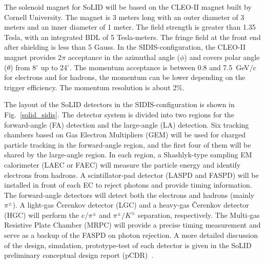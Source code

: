 The solenoid magnet for SoLID will be based on the CLEO-II magnet built by
Cornell University. The magnet is 3 meters long with an outer diameter of 3
meters and an inner diameter of 1 meter. The field strength is greater than
1.35 Tesla, with an integrated BDL of 5 Tesla-meters. The fringe field at the
front end after shielding is less than 5 Gauss. In the SIDIS-configuration, the
CLEO-II magnet provides 2$\pi$ acceptance in the azimuthal angle ($\phi$) and
covers polar angle ($\theta$) from 8$^{\circ}$ up to 24$^{\circ}$. The
momentum acceptance is between 0.8 and 7.5~GeV/c for electrons and for hadrons,
the momentum can be lower depending on the trigger efficiency.  The momentum
resolution is about 2\%.

The layout of the SoLID detectors in the SIDIS-configuration is shown in
Fig.~\ref{solid_sidis}. The detector system is divided into two regions for the
forward-angle (FA) detection and the large-angle (LA) detection. Six tracking
chambers based on Gas Electron Multipliers (GEM) will be used for charged
particle tracking in the forward-angle region, and the first four of them will
be shared by the large-angle
region. In each region, a Shashlyk-type sampling EM calorimeter (LAEC or
FAEC) will measure the particle energy and identify electrons from hadrons. A
scintillator-pad detector (LASPD and FASPD) will be installed in front of each
EC to reject photons and provide timing information. The forward-angle
detectors will detect both the electrons and hadrons (mainly $\pi^{\pm}$). A
light-gas \v{C}erenkov detector (LGC) and a heavy-gas \v{C}erenkov detector
(HGC) will perform the $e/\pi^{\pm}$ and $\pi^{\pm}/K^{\pm}$ separation,
respectively. The Multi-gas Resistive Plate Chamber (MRPC) will provide a
precise timing measurement and serve as a backup of the FASPD on photon
rejection. A more detailed discussion of the design, simulation, prototype-test
of each detector is given in the SoLID preliminary conceptual design report
(pCDR)~\cite{solid_pcdr}.

